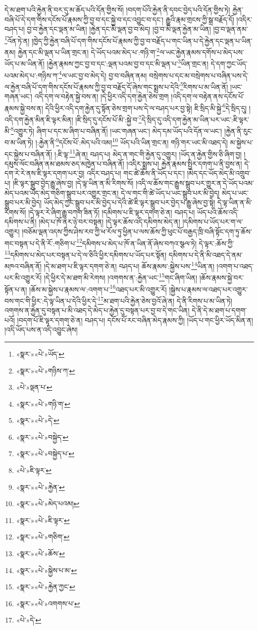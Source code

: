 དེ་མ་ཐག་པའི་རྐྱེན་ནི་བར་དུ་མ་ཆོད་པའི་དོན་གྱིས་སོ། །བདག་པོའི་རྐྱེན་ནི་དབང་བྱེད་པའི་དོན་གྱིས་ཏེ། རྐྱེན་བཞི་པོ་དེ་དག་གིས་དངོས་པོ་རྣམས་ཀྱི་བྱ་བ་དང་སྐྱེ་བ་དང་འབྱུང་བ་དང་། རྒྱུའི་རྣམ་གྲངས་ཀྱི་སྒྲ་བརྗོད་དོ། །འདིར་བཤད་པ། བྱ་བ་རྐྱེན་དང་ལྡན་མ་ཡིན། །རྐྱེན་དང་མི་ལྡན་བྱ་བ་མེད། །བྱ་བ་མི་ལྡན་རྐྱེན་མ་ཡིན། །བྱ་བ་ལྡན་ནམ་\footnote{«སྣར་»«པེ་»ཡོད་}འོན་ཏེ་ན། །ཁྱེད་ཀྱི་རྐྱེན་བཞི་པོ་དག་གིས་དངོས་པོ་རྣམས་ཀྱི་བྱ་བ་བརྗོད་པ་གང་ཡིན་པ་དེ་རྐྱེན་དང་ལྡན་པ་ཡིན་ནམ། རྐྱེན་དང་མི་ལྡན་པ་ཡིན་གྲང་ན། དེ་ཡོད་པའམ་མེད་པ་:གཉི་ག་\footnote{«སྣར་»«པེ་»གཉིས་ཀ་}ལ་ཡང་རྐྱེན་རྣམས་དགོས་པ་མེད་པས་ཡོད་པ་མ་ཡིན་ནོ། །རྐྱེན་རྣམས་ཀྱང་བྱ་བ་དང་:ལྡན་པའམ་བྱ་བ་དང་མི་ལྡན་པ་\footnote{«པེ་»ལྡན་པ་}ཡིན་གྲང་ན། དེ་དག་ཀྱང་ཡོད་པའམ་མེད་པ་:གཉིས་ཀ་\footnote{«སྣར་»«པེ་»གཉི་ག་}ལ་ཡང་བྱ་བ་མེད་དེ། བྱ་བ་བཞིན་ནམ། བསྲེགས་པ་དང་མ་བསྲེགས་པ་བཞིན་པས་དེ་ལ་རྐྱེན་བཞི་པོ་དག་གིས་དངོས་པོ་རྣམས་ཀྱི་བྱ་བ་བརྗོད་དོ་ཞེས་གང་སྨྲས་པ་དེའི་\footnote{«སྣར་»«པེ་»དེ་}རིགས་པ་མ་ཡིན་ནོ། །ཡང་གཞན་ཡང་། འདི་དག་ལ་བརྟེན་སྐྱེ་བས་ན། །དེ་ཕྱིར་འདི་དག་རྐྱེན་ཅེས་གྲག །འདི་དག་ལ་བརྟེན་ནས་དངོས་པོ་རྣམས་སྐྱེ་བས་ན། དེའི་ཕྱིར་འདི་དག་རྐྱེན་དུ་སྟོན་ཅེས་གྲག་པས་དེ་ལ་བཤད་པར་བྱ་སྟེ། ཇི་སྲིད་མི་སྐྱེ་\footnote{«སྣར་»«པེ་»བསྐྱེད་}དེ་སྲིད་དུ། །འདི་དག་རྐྱེན་མིན་ཇི་ལྟར་མིན། །ཇི་སྲིད་དུ་དངོས་པོ་མི་:སྐྱེ་བ་\footnote{«སྣར་»«པེ་»བསྐྱེད་པ་}དེ་སྲིད་དུ་འདི་དག་རྐྱེན་མ་ཡིན་པར་ཡང་:ཇི་ལྟར་མི་\footnote{«པེ་»ཇི་ལྟར་}འགྱུར་ཏེ། ཞིག་པ་དང་མ་ཞིག་པ་བཞིན་ནོ། །ཡང་གཞན་ཡང་། མེད་དམ་ཡོད་པའི་དོན་ལ་ཡང་། །རྐྱེན་ནི་རུང་བ་མ་ཡིན་ཏེ། །:རྐྱེན་ནི་\footnote{«སྣར་»«པེ་»རྐྱེན་}དངོས་པོ་:མེད་པའི་འམ།\footnote{«སྣར་»«པེ་»མེད་པའམ།} ཡོད་པའི་ཡིན་གྲང་ན། གཉི་གར་ཡང་མི་འཐད་དེ། མ་སྐྱེས་པ་དང་སྐྱེས་པ་བཞིན་ནོ། །:ཇི་ལྟ་\footnote{«སྣར་»«པེ་»ཇི་ལྟར་}ཞེ་ན། བཤད་པ། མེད་ན་གང་གི་རྐྱེན་དུ་འགྱུར། །ཡོད་ན་རྐྱེན་གྱིས་ཅི་ཞིག་བྱ། །དམུས་ལོང་བཞིན་ནམ་ཐམས་ཅད་མཁྱེན་པ་བཞིན་ནོ། །འདིར་སྨྲས་པ། རྐྱེན་རྣམས་སྤྱིར་དགག་པ་ནི་བྱས་ན། དེ་དག་རེ་རེ་ནས་ཇི་ལྟར་དགག་པར་བྱ། འདིར་བཤད་པ། གང་ཚེ་ཆོས་ནི་ཡོད་པ་དང་། །མེད་དང་ཡོད་མེད་མི་འགྲུབ་པ། །ཇི་ལྟར་སྒྲུབ་བྱེད་རྒྱུ་ཞེས་བྱ། །དེ་ལྟ་ཡིན་ན་མི་རིགས་སོ། །འདི་ལ་ཆོས་གང་རྒྱུས་སྒྲུབ་པར་གྱུར་ན་དེ་ཡོད་པའམ་མེད་པའམ་ཡོད་མེད་གཅིག་སྒྲུབ་པར་འགྱུར་གྲང་ན། དེ་ལ་གང་གི་ཚེ་ཡོད་པ་ཡང་སྒྲུབ་པར་མི་བྱེད། མེད་པ་ཡང་སྒྲུབ་པར་མི་བྱེད། ཡོད་མེད་ཀྱང་སྒྲུབ་པར་མི་བྱེད་པ་དེའི་ཚེ་ཇི་ལྟར་སྒྲུབ་པར་བྱེད་པ་རྒྱུ་ཞེས་བྱ་སྟེ། དེ་ལྟ་ཡིན་ན་མི་རིགས་སོ། །དེ་ལྟར་རེ་ཞིག་རྒྱུ་བཀག་ཟིན་ཏོ། །དམིགས་པ་ཇི་ལྟར་དགག་ཅེ་ན། བཤད་པ། ཡོད་པའི་ཆོས་འདི་དམིགས་པ་ནི། །མེད་པ་ཁོ་ནར་ཉེ་བར་བསྟན། །དེ་ལྟར་ཆོས་འདི་དམིགས་མེད་ན། །དམིགས་པ་ཡོད་པར་ག་ལ་འགྱུར། །བཅོམ་ལྡན་འདས་ཀྱིས་ཤེས་རབ་ཀྱི་ཕ་རོལ་ཏུ་ཕྱིན་པ་ལས་ཆོས་ཀྱི་ཕུང་པོ་བརྒྱད་ཁྲི་བཞི་སྟོང་དག་ཏུ་ཆོས་གང་བསྟན་པ་དེ་ནི་རོ་:གཅིག་པ་\footnote{«སྣར་»«པེ་»གཅིག་}དམིགས་པ་མེད་པ་ཁོ་ན་ཡིན་ནོ་ཞེས་བཀའ་སྩལ་ཏེ། དེ་ལྟར་:ཆོས་ཀྱི་\footnote{«སྣར་»«པེ་»ཆོས་}དམིགས་པ་མེད་པར་བསྟན་པ་དེ་ལ་ཅིའི་ཕྱིར་དམིགས་པ་ཡོད་པར་སྟོན། དམིགས་པ་དེ་ནི་མི་འཐད་དེ་ནམ་མཁའ་བཞིན་ནོ། །དེ་མ་ཐག་པ་ཇི་ལྟར་དགག་ཅེ་ན། བཤད་པ། ཆོས་རྣམས་:སྐྱེས་པས་\footnote{«སྣར་»«པེ་»སྐྱེས་པ་མ་}ཡིན་ན། །འགག་པ་འཐད་པར་མི་འགྱུར་རོ། །དེ་ཕྱིར་དེ་མ་ཐག་མི་རེགས། །འགགས་ན་:རྐྱེན་ཡང་\footnote{«སྣར་»«པེ་»རྐྱེན་ཀྱང་}གང་ཞིག་ཡིན། །ཆོས་རྣམས་སྐྱེ་བར་སྟོན་པ་ན། །ཆོས་མ་སྐྱེས་པ་རྣམས་ལ་:འགག་པ་\footnote{«སྣར་»«པེ་»འགགས་པ་}འཐད་པར་མི་འགྱུར་རོ། །སྐྱེས་པ་རྣམས་ལ་འཐད་པར་འགྱུར་བས་གང་གི་ཕྱིར་:དེ་ལྟ་ཡིན་པ་དེའི་ཕྱིར་དེ་\footnote{«པེ་»དེ་}མ་ཐག་པའི་རྐྱེན་ཅེས་བྱའོ་ཞེ་ན། དེ་ནི་རིགས་པ་མ་ཡིན་ཏེ། འགགས་ན་རྐྱེན་དུ་བསྟན་པ་མི་འཐད་དེ་མེད་པ་རྐྱེན་དུ་བསྟན་པར་བྱ་བ་དེ་གང་ཡིན། དེ་ནི་དེ་མ་ཐག་པ་དགག་པའོ། །བདག་པོ་ཇི་ལྟར་དགག་ཅེ་ན། བཤད་པ། དངོས་པོ་རང་བཞིན་མེད་རྣམས་ཀྱི། །ཡོད་པ་གང་ཕྱིར་ཡོད་མིན་ན། །འདི་ཡོད་པས་ན་འདི་འབྱུང་ཞེས། 